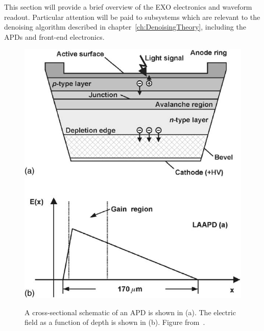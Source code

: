 This section will provide a brief overview of the EXO electronics and waveform readout.  Particular attention will be paid to subsystems which are relevant to the denoising algorithm described in chapter~\ref{ch:DenoisingTheory}, including the APDs and front-end electronics.

\begin{figure}
\begin{center}
\includegraphics[keepaspectratio=true,width=\textwidth]{APDCrossSection.png}
\end{center}
\renewcommand{\baselinestretch}{1}
\small\normalsize
\begin{quote}
\caption{A cross-sectional schematic of an APD is shown in (a).  The electric field as a function of depth is shown in (b).  Figure from~\cite{Moszynski2002504}.}
\label{fig:APDCrossSection}
\end{quote}
\end{figure}
\renewcommand{\baselinestretch}{2}
\small\normalsize

